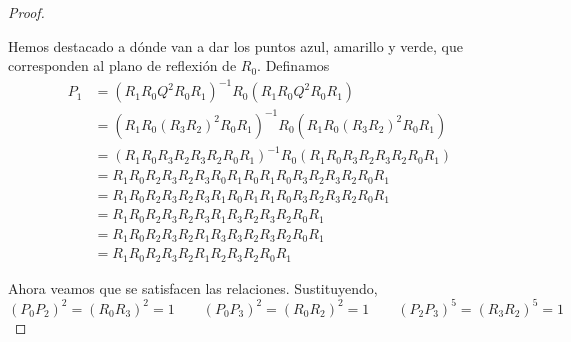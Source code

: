 \documentclass[spanish]{article}
\theoremstyle{definition}
\begin{document}
\begin{proof}
\begin{figure}[H]
\begin{subfigure}{0.4\linewidth}
	\end{subfigure}
\end{figure}
	Hemos destacado a dónde van a dar los puntos azul, amarillo y verde, que corresponden al plano de reflexión de $R_0$. Definamos 
	\begin{align*}
		P_1&=(R_1R_0Q^2R_0R_1)^{-1}R_0(R_1R_0Q^2R_0R_1)\\
		&=(R_1R_0(R_3R_2)^2R_0R_1)^{-1}R_0(R_1R_0(R_3R_2)^2R_0R_1)\\
		&=(R_1R_0R_3R_2R_3R_2R_0R_1)^{-1}R_0(R_1R_0R_3R_2R_3R_2R_0R_1)\\
		&=R_1R_0R_2R_3R_2R_3R_0R_1R_0R_1R_0R_3R_2R_3R_2R_0R_1\\
		&=R_1R_0R_2R_3R_2R_3R_1R_0R_1R_1R_0R_3R_2R_3R_2R_0R_1\\	&=R_1R_0R_2R_3R_2R_3R_1R_3R_2R_3R_2R_0R_1\\
		&=R_1R_0R_2R_3R_2R_1R_3R_3R_2R_3R_2R_0R_1\\
		&=R_1R_0R_2R_3R_2R_1R_2R_3R_2R_0R_1
	\end{align*}
	
%

	Ahora veamos que se satisfacen las relaciones. Sustituyendo,
	\[(P_0P_2)^2=(R_0R_3)^2=1\qquad (P_0P_3)^2=(R_0R_2)^2=1\qquad (P_2P_3)^5=(R_3R_2)^5=1\]

\end{proof}
\end{document}
